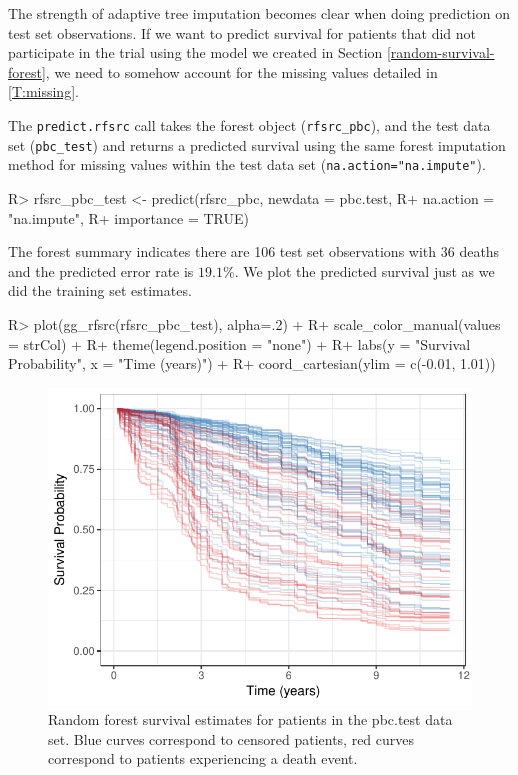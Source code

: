 \documentclass[article]{jss}
\begin{document}
The strength of adaptive tree imputation becomes clear when doing
prediction on test set observations. If we want to predict survival for
patients that did not participate in the trial using the model we
created in Section \ref{random-survival-forest}, we need to somehow
account for the missing values detailed in \autoref{T:missing}.

The \texttt{predict.rfsrc} call takes the forest object
(\texttt{rfsrc\_pbc}), and the test data set (\texttt{pbc\_test}) and
returns a predicted survival using the same forest imputation method for
missing values within the test data set
(\texttt{na.action="na.impute"}).

\begin{Schunk}
\begin{Sinput}
R> rfsrc_pbc_test <- predict(rfsrc_pbc, newdata = pbc.test,
R+                           na.action = "na.impute",
R+                           importance = TRUE)
\end{Sinput}
\end{Schunk}

The forest summary indicates there are 106 test set observations with 36
deaths and the predicted error rate is \(19.1\%\). We plot the predicted
survival just as we did the training set estimates.

\begin{Schunk}
\begin{Sinput}
R> plot(gg_rfsrc(rfsrc_pbc_test), alpha=.2) +
R+   scale_color_manual(values = strCol) +
R+   theme(legend.position = "none") +
R+   labs(y = "Survival Probability", x = "Time (years)") +
R+   coord_cartesian(ylim = c(-0.01, 1.01))
\end{Sinput}
\begin{figure}[!htb]

{\centering \includegraphics{rfs-predictPlot-1} 

}

\caption[Random forest survival estimates for patients in the pbc.test data set]{Random forest survival estimates for patients in the pbc.test data set. Blue curves correspond to censored patients, red curves correspond to patients experiencing a death event.}\label{fig:predictPlot}
\end{figure}
\end{Schunk}
\end{document}
